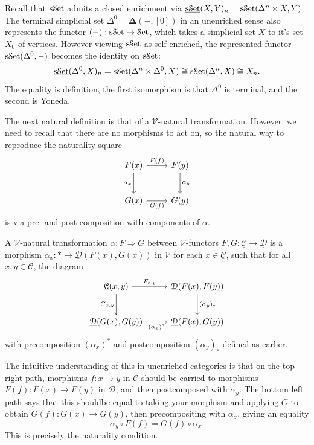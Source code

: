 Recall that $\mathrm{s}\mathcal{S}\mathrm{et}$ admits a closed enrichment via $\underline{\mathrm{s}\mathcal{S}\mathrm{et}} (X,Y)_n=\mathrm{s}\mathcal{S}\mathrm{et}(\Delta^n\times X,Y)$. The terminal simplicial set $\Delta^0 = \boldsymbol{\Delta} (-,[0])$ in an unenriched sense also represents the functor $(-): \mathrm{s}\mathcal{S}\mathrm{et} \to \mathcal{S}\mathrm{et} $, which takes a simplicial set $X$ to it's set $X_0$ of vertices. However viewing $\mathrm{s}\mathcal{S}\mathrm{et}$ as self-enriched, the represented functor $\underline{\mathrm{s}\mathcal{S}\mathrm{et}} (\Delta^0,-)$ becomes the identity on $\mathrm{s}\mathcal{S}\mathrm{et}$:
\[
	\underline{\mathrm{s}\mathcal{S}\mathrm{et}} (\Delta^0,X)_n=\mathrm{s}\mathcal{S}\mathrm{et}(\Delta^n \times \Delta^0,X)\cong\mathrm{s}\mathcal{S}\mathrm{et}(\Delta^n,X)\cong X_n
.\]
The equality is definition, the first isomorphism is that $\Delta^0$ is terminal, and the second is Yoneda.

The next natural definition is that of a $\mathcal{V} $-natural transformation. However, we need to recall that there are no morphisms to act on, so the natural way to reproduce the naturality square
\[\begin{tikzcd}[row sep = 2.5em, column sep = 2.5em]
F(x)\ar[" F(f) ", r] \ar[" \alpha_x "', d]  & F(y)\ar[" \alpha_y ", d]  \\
G(x)\ar[" G(f) "', r]  & G(y)
\end{tikzcd}\]
is via pre- and post-composition with components of $\alpha$.

\begin{definition}\label{dfn:3.6}
	A $\mathcal{V} $-natural transformation $\alpha : F \Rightarrow G$ between $\mathcal{V} $-functors $F,G : \underline{\mathcal{C} }  \to \underline{\mathcal{D} } $ is a morphism $\alpha_x : * \to \underline{\mathcal{D} } (F(x),G(x))$ in $\mathcal{V} $ for each $x\in \underline{\mathcal{C} } $, such that for all $x,y\in \underline{\mathcal{C} } $, the diagram
	\[\begin{tikzcd}[row sep = 2.5em, column sep = 2.5em]
	\underline{\mathcal{C} } (x,y)\ar[" F_{x\text{,} y}  ", r] \ar[" G_{x\text{,} y}  "', d]  & \underline{\mathcal{D} } (F(x),F(y))\ar[" (\alpha_y)_* ", d]  \\
	\underline{\mathcal{D} } (G(x),G(y))\ar[" (\alpha_x)^* "', r]  & \underline{\mathcal{D} } (F(x),G(y))
	\end{tikzcd}\]
	with precomposition $(\alpha_x)^*$ and postcomposition $(\alpha_y)_*$ defined as earlier.
\end{definition}

The intuitive understanding of this in unenriched categories is that on the top right path, morphisms $f : x \to y$ in $\mathcal{C} $ should be carried to morphisms $F(f): F(x) \to F(y)$ in $\mathcal{D} $, and then postcomposed with $\alpha_y$. The bottom left path says that this shouldbe equal to taking your morphism and applying $G$ to obtain $G(f): G(x) \to G(y)$, then precompositing with $\alpha_x$, giving an equality
\[
	\alpha_y \circ F(f)=G(f)\circ \alpha_x
.\]
This is precisely the naturality condition.

